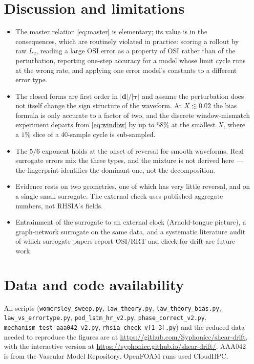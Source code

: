 \documentclass[11pt,a4paper]{article}
\newcommand{\OSI}{\mathrm{OSI}}
\newcommand{\RRT}{\mathrm{RRT}}
\begin{document}
\section{Discussion and limitations}

\begin{itemize}
\item The master relation \eqref{eq:master} is elementary; its value is in
the consequences, which are routinely violated in practice: scoring a rollout
by raw $L_2$, reading a large $\OSI$ error as a property of $\OSI$ rather
than of the perturbation, reporting one-step accuracy for a model whose limit
cycle runs at the wrong rate, and applying one error model's constants to a
different error type.
\item The closed forms are first order in $|\mathbf d|/|\boldsymbol\tau|$ and
assume the perturbation does not itself change the sign structure of the
waveform. At $X\lesssim0.02$ the bias formula is only accurate to a factor of
two, and the discrete window-mismatch experiment departs from
\eqref{eq:window} by up to $58\%$ at the smallest $X$, where a $1\%$ slice of
a 40-sample cycle is sub-sampled.
\item The $5/6$ exponent holds at the onset of reversal for smooth
waveforms. Real surrogate errors mix the three types, and the mixture is not
derived here --- the fingerprint identifies the dominant one, not the
decomposition.
\item Evidence rests on two geometries, one of which has very little
reversal, and on a single small surrogate. The external check uses
published aggregate numbers, not RHSIA's fields.
\item Entrainment of the surrogate to an external clock (Arnold-tongue
picture), a graph-network surrogate on the same data, and a systematic
literature audit of which surrogate papers report $\OSI/\RRT$ and check for
drift are future work.
\end{itemize}

\section*{Data and code availability}
All scripts (\texttt{womersley\_sweep.py}, \texttt{law\_theory.py},
\texttt{law\_theory\_bias.py}, \texttt{law\_vs\_errortype.py},
\texttt{pod\_lstm\_hr\_v2.py}, \texttt{phase\_correct\_v2.py},
\texttt{mechanism\_test\_aaa042\_v2.py}, \texttt{rhsia\_check\_v[1-3].py})
and the reduced data needed to reproduce the figures are at
\url{https://github.com/Syphonicc/shear-drift}, with the interactive version
at \url{https://syphonicc.github.io/shear-drift/}. AAA042 is from the Vascular
Model Repository. OpenFOAM runs used CloudHPC.
\end{document}
